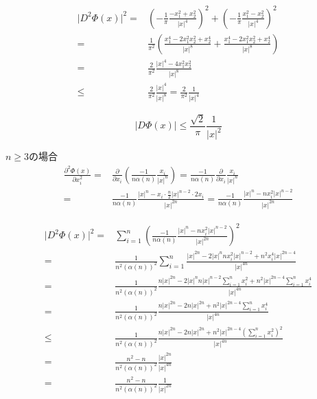 \documentclass[12pt,b5paper]{ltjsarticle}
\begin{document}
\begin{align}
 \lvert D^2\Phi(x)\rvert^2
  =&
  \left(
         -\frac{1}{\pi} \frac{-x_{1}^2+x_{2}^{2}}{\lvert x \rvert^4}
  \right)^2 + \left(
         -\frac{1}{\pi} \frac{x_{1}^2-x_{2}^{2}}{\lvert x \rvert^4}
  \right)^2\\
  =&
  \frac{1}{\pi^2}
  \left(
    \frac{x_{1}^4-2x_{1}^{2}x_{2}^{2}+x_{2}^{4}}{\lvert x \rvert^8}
    +
    \frac{x_{1}^4-2x_{1}^{2}x_{2}^{2}+x_{2}^{4}}{\lvert x \rvert^8}
  \right)\\
 =&
 \frac{2}{\pi^2}
 \frac{\lvert x \rvert^4 -4x_{1}^{2}x_{2}^{2}}{\lvert x \rvert^8}\\
 \leq&
  \frac{2}{\pi^2}
  \frac{\lvert x \rvert^4}{\lvert x \rvert^8}
 =\frac{2}{\pi^2}\frac{1}{\lvert x \rvert^4}
\end{align}

\begin{equation}
 \lvert D \Phi(x)\rvert \leq \frac{\sqrt{2}}{\pi}\frac{1}{\lvert x \rvert^2}
\end{equation}

$n\geq 3$の場合
\begin{align}
 \frac{\partial^2 \Phi(x)}{\partial x_{i}^2}
  =& \frac{\partial}{\partial x_{i}}
  \left( \frac{-1}{n\alpha(n)} \frac{x_{i}}{\lvert x \rvert^{n}} \right)
  =\frac{-1}{n\alpha(n)} \frac{\partial}{\partial x_{i}} \frac{x_{i}}{\lvert x \rvert^{n}}\\
  =& \frac{-1}{n\alpha(n)} \frac{\lvert x \rvert^{n}-x_{i}\cdot \frac{n}{2}\lvert x \rvert^{n-2}\cdot 2x_i}{\lvert x \rvert^{2n}}
  = \frac{-1}{n\alpha(n)} \frac{\lvert x \rvert^{n}-nx_{i}^{2}\lvert x \rvert^{n-2}}{\lvert x \rvert^{2n}}
\end{align}

\begin{align}
 \lvert D^2\Phi(x)\rvert^2
  =& \sum_{i=1}^{n} \left( \frac{-1}{n\alpha(n)} \frac{\lvert x \rvert^{n} - nx_{i}^{2} \lvert x \rvert^{n-2}}{\lvert x \rvert^{2n}} \right)^2 \\
   =& \frac{1}{n^2(\alpha(n))^2} \sum_{i=1}^{n}  \frac{\lvert x \rvert^{2n} - 2\lvert x \rvert^{n} n x_{i}^{2} \lvert x \rvert^{n-2}  + n^2x_{i}^{4} \lvert x \rvert^{2n-4}}{\lvert x \rvert^{4n}} \\
   =& \frac{1}{n^2(\alpha(n))^2}   \frac{n \lvert x \rvert^{2n} - 2\lvert x \rvert^{n} n \lvert x \rvert^{n-2}\sum_{i=1}^{n}x_{i}^{2}  + n^2 \lvert x \rvert^{2n-4} \sum_{i=1}^{n}x_{i}^{4}}{\lvert x \rvert^{4n}} \\
  =& \frac{1}{n^2(\alpha(n))^2}   \frac{n \lvert x \rvert^{2n} - 2n \lvert x \rvert^{2n} + n^2 \lvert x \rvert^{2n-4} \sum_{i=1}^{n}x_{i}^{4}}{\lvert x \rvert^{4n}} \\
 \leq& \frac{1}{n^2(\alpha(n))^2}   \frac{n \lvert x \rvert^{2n} - 2n \lvert x \rvert^{2n} + n^2 \lvert x \rvert^{2n-4} \left(\sum_{i=1}^{n}x_{i}^{2}\right)^2}{\lvert x \rvert^{4n}} \\
 =& \frac{n^2-n}{n^2(\alpha(n))^2}   \frac{ \lvert x \rvert^{2n} }{\lvert x \rvert^{4n}} \\
  =& \frac{n^2-n}{n^2(\alpha(n))^2}   \frac{ 1 }{\lvert x \rvert^{2n}}
\end{align}
\end{document}
